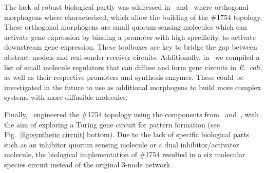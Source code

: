 The lack of robust biological partly was addressed in~\cite{Meyer2019} and~\cite{Du2020} where orthogonal morphogens where characterized, which allow the building of the \#1754 topology.
These orthogonal morphogens are small quorum-sensing molecules which can activate gene expression by binding a promoter with high specificity, to activate downstream gene expression.
These toolboxes are key to bridge the gap between abstract models and real-sender receiver circuits.
Additionally, in~\cite{huidobro} we compiled a list of small molecule regulators that can diffuse and form gene circuits in \textit{E.~coli}, as well as their respective promoters and synthesis enzymes.
These could be investigated in the future to use as additional morphogens to build more complex systems with more diffusible molecules.

Finally,~\cite{Tica2020} engineered the \#1754 topology using the components from~\cite{Meyer2019} and~\cite{Du2020}, with the aim of exploring a Turing gene circuit for pattern formation (see Fig.~\ref{fig:synthetic circuit} bottom).
Due to the lack of specific biological parts such as an inhibitor quorum sensing molecule or a dual inhibitor/activator molecule, the biological implementation of \#1754 resulted in a six molecular species circuit instead of the original 3-node network.

